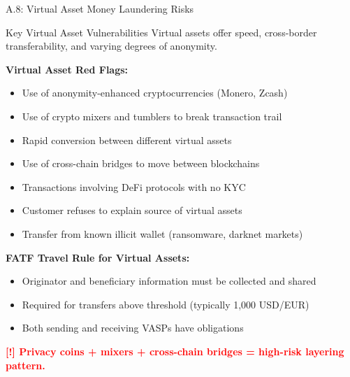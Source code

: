 \documentclass[11pt,a4paper]{beamer}
\newcommand{\redflag}[1]{\textcolor{red}{\textbf{[!] #1}}}
\begin{document}
	\begin{frame}{A.8: Virtual Asset Money Laundering Risks}
		\begin{block}{Key Virtual Asset Vulnerabilities}
			Virtual assets offer speed, cross-border transferability, and varying degrees of anonymity.
		\end{block}
		\textbf{Virtual Asset Red Flags:}
		\begin{itemize}
			\item Use of anonymity-enhanced cryptocurrencies (Monero, Zcash)
			\item Use of crypto mixers and tumblers to break transaction trail
			\item Rapid conversion between different virtual assets
			\item Use of cross-chain bridges to move between blockchains
			\item Transactions involving DeFi protocols with no KYC
			\item Customer refuses to explain source of virtual assets
			\item Transfer from known illicit wallet (ransomware, darknet markets)
		\end{itemize}
		\textbf{FATF Travel Rule for Virtual Assets:}
		\begin{itemize}
			\item Originator and beneficiary information must be collected and shared
			\item Required for transfers above threshold (typically 1,000 USD/EUR)
			\item Both sending and receiving VASPs have obligations
		\end{itemize}
		\redflag{Privacy coins + mixers + cross-chain bridges = high-risk layering pattern.}
	\end{frame}
	
\end{document}
